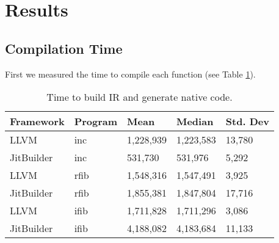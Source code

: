 \section{Results}
\label{sec:results}
\subsection{Compilation Time}
First we measured the time to compile each function (see Table \ref{tab:compile-time}).
\begin{table}[]
    \begin{tabular}{@{}lllll@{}}
    \toprule
    Framework  & Program & Mean    & Median  & Std. Dev \\ \midrule
    LLVM       & inc     & 1,228,939 & 1,223,583 & 13,780    \\
    JitBuilder & inc     &   531,730  &  531,976  & 5,292     \\
    LLVM       & rfib    & 1,548,316 & 1,547,491 & 3,925     \\
    JitBuilder & rfib    & 1,855,381 & 1,847,804 & 17,716    \\
    LLVM       & ifib    & 1,711,828 & 1,711,296 & 3,086     \\
    JitBuilder & ifib    & 4,188,082 & 4,183,684 & 11,133    \\ \bottomrule
    \end{tabular}
    \caption{Time to build IR and generate native code.}
    \label{tab:compile-time}
    \end{table}